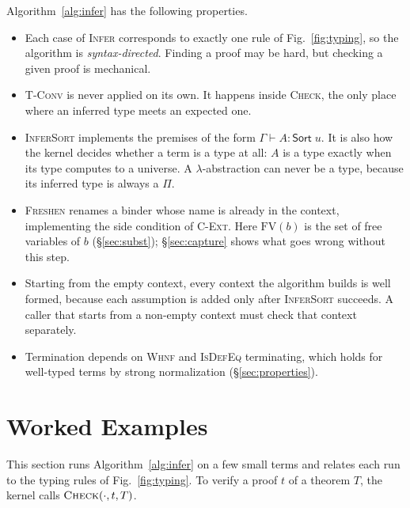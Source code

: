 \documentclass[acmsmall,screen,nonacm]{acmart}
\newcommand{\Sort}[1]{\mathsf{Sort}\;#1}
\newcommand{\FV}{\mathrm{FV}}
\begin{document}
Algorithm~\ref{alg:infer} has the following properties.
\begin{itemize}
  \item Each case of \textsc{Infer} corresponds to exactly one rule of Fig.~\ref{fig:typing}, so the algorithm is \emph{syntax-directed}.
    Finding a proof may be hard, but checking a given proof is mechanical.
  \item \textsc{T-Conv} is never applied on its own. It happens inside \textsc{Check}, the only place where an inferred type meets an expected one.
  \item \textsc{InferSort} implements the premises of the form $\Gamma \vdash A : \Sort{u}$.
    It is also how the kernel decides whether a term is a type at all: $A$ is a type exactly when its type computes to a universe.
    A $\lambda$-abstraction can never be a type, because its inferred type is always a $\Pi$.
  \item \textsc{Freshen} renames a binder whose name is already in the context, implementing the side condition of \textsc{C-Ext}.
    Here $\FV(b)$ is the set of free variables of $b$ (\S\ref{sec:subst}); \S\ref{sec:capture} shows what goes wrong without this step.
  \item Starting from the empty context, every context the algorithm builds is well formed, because each assumption is added only after \textsc{InferSort} succeeds.
    A caller that starts from a non-empty context must check that context separately.
  \item Termination depends on \textsc{Whnf} and \textsc{IsDefEq} terminating, which holds for well-typed terms by strong normalization (\S\ref{sec:properties}).
\end{itemize}

\section{Worked Examples}
\label{sec:examples}

This section runs Algorithm~\ref{alg:infer} on a few small terms and relates each run to the typing rules of Fig.~\ref{fig:typing}.
To verify a proof $t$ of a theorem $T$, the kernel calls $\textsc{Check}(\cdot, t, T)$.
\end{document}
